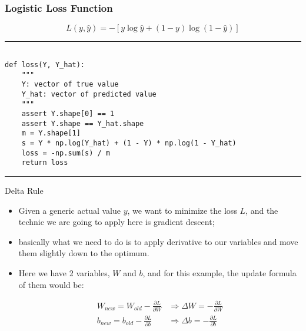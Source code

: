 \documentclass[11pt]{beamer}
\begin{document}
\begin{frame}[fragile]
\frametitle{Logistic Loss Function}

$$ L(y, \hat{y}) = -[y\log{\hat{y}} + (1 - y)\log{(1 - \hat{y})}] $$

\rule{\textwidth}{1pt}
\scriptsize
\begin{verbatim}

def loss(Y, Y_hat):
    """
    Y: vector of true value
    Y_hat: vector of predicted value
    """
    assert Y.shape[0] == 1
    assert Y.shape == Y_hat.shape
    m = Y.shape[1]
    s = Y * np.log(Y_hat) + (1 - Y) * np.log(1 - Y_hat)
    loss = -np.sum(s) / m
    return loss

\end{verbatim}
\rule{\textwidth}{1pt}
\end{frame}
\begin{frame}{Delta Rule}
\begin{itemize}
\item Given a generic actual value $y$, we want to minimize the loss $L$, and the technic we are going to apply here is gradient descent; 
\item basically what we need to do is to apply derivative to our variables and move them slightly down to the optimum. 
\item Here we have 2 variables, $W$ and $b$, and for this example, the update formula of them would be:

\begin{align*}
W_{new} = W_{old} - \frac{\partial L}{\partial W} &\Rightarrow \Delta W = - \frac{\partial L}{\partial W} \\
b_{new} = b_{old} - \frac{\partial L}{\partial b} &\Rightarrow \Delta b = - \frac{\partial L}{\partial b} \\
\end{align*}

\end{itemize}
\end{frame}
\end{document}
